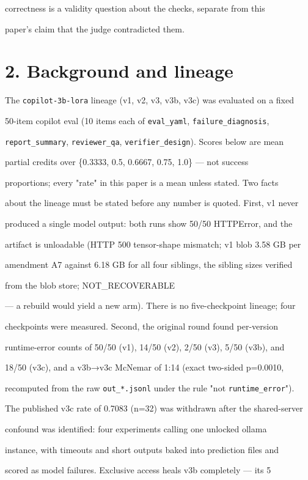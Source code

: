 \documentclass[11pt,a4paper]{article}
\begin{document}
correctness is a validity question about the checks, separate from this

paper's claim that the judge contradicted them.

\section*{2. Background and lineage}
The \texttt{copilot-3b-lora} lineage (v1, v2, v3, v3b, v3c) was evaluated on a fixed

50-item copilot eval (10 items each of \texttt{eval\_yaml}, \texttt{failure\_diagnosis},

\texttt{report\_summary}, \texttt{reviewer\_qa}, \texttt{verifier\_design}). Scores below are mean

partial credits over \{0.3333, 0.5, 0.6667, 0.75, 1.0\} — not success

proportions; every "rate" in this paper is a mean unless stated. Two facts

about the lineage must be stated before any number is quoted. First, v1 never

produced a single model output: both runs show 50/50 HTTPError, and the

artifact is unloadable (HTTP 500 tensor-shape mismatch; v1 blob 3.58 GB per

amendment A7 against 6.18 GB for all four siblings, the sibling sizes verified

from the blob store; NOT\_RECOVERABLE

— a rebuild would yield a new arm). There is no five-checkpoint lineage; four

checkpoints were measured. Second, the original round found per-version

runtime-error counts of 50/50 (v1), 14/50 (v2), 2/50 (v3), 5/50 (v3b), and

18/50 (v3c), and a v3b→v3c McNemar of 1:14 (exact two-sided p=0.0010,

recomputed from the raw \texttt{out\_*.jsonl} under the rule "not \texttt{runtime\_error}").

The published v3c rate of 0.7083 (n=32) was withdrawn after the shared-server

confound was identified: four experiments calling one unlocked ollama

instance, with timeouts and short outputs baked into prediction files and

scored as model failures. Exclusive access heals v3b completely — its 5
\end{document}
